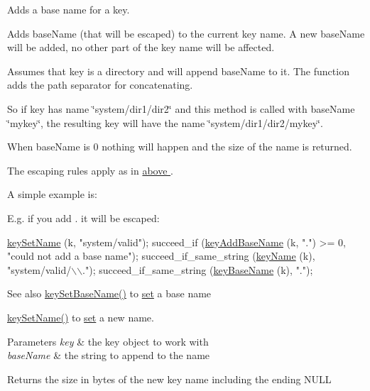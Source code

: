 Adds a base name for a key. 

Adds {\ttfamily base\+Name} (that will be escaped) to the current key name. A new base\+Name will be added, no other part of the key name will be affected.

Assumes that {\ttfamily key} is a directory and will append {\ttfamily base\+Name} to it. The function adds the path separator for concatenating.

So if {\ttfamily key} has name {\ttfamily \char`\"{}system/dir1/dir2\char`\"{}} and this method is called with {\ttfamily base\+Name} {\ttfamily \char`\"{}mykey\char`\"{}}, the resulting key will have the name {\ttfamily \char`\"{}system/dir1/dir2/mykey\char`\"{}}.

When {\ttfamily base\+Name} is 0 nothing will happen and the size of the name is returned.

The escaping rules apply as in \hyperlink{group__keyname}{above }.

A simple example is\+: 
\begin{DoxyCodeInclude}
\end{DoxyCodeInclude}
 E.\+g. if you add . it will be escaped\+: 
\begin{DoxyCodeInclude}
        \hyperlink{group__keyname_ga7699091610e7f3f43d2949514a4b35d9}{keySetName} (k, \textcolor{stringliteral}{"system/valid"});
        succeed\_if (\hyperlink{group__keyname_gaa942091fc4bd5c2699e49ddc50829524}{keyAddBaseName} (k, \textcolor{stringliteral}{"."}) >= 0, \textcolor{stringliteral}{"could not add a base name"});
        succeed\_if\_same\_string (\hyperlink{group__keyname_ga8e805c726a60da921d3736cda7813513}{keyName} (k), \textcolor{stringliteral}{"system/valid/\(\backslash\)\(\backslash\)."});
        succeed\_if\_same\_string (\hyperlink{group__keyname_gaaff35e7ca8af5560c47e662ceb9465f5}{keyBaseName} (k), \textcolor{stringliteral}{"."});
\end{DoxyCodeInclude}
 \begin{DoxySeeAlso}{See also}
\hyperlink{group__keyname_ga6e804bd453f98c28b0ff51430d1df407}{key\+Set\+Base\+Name()} to \hyperlink{classkdb_1_1Key_a615124f0a2b291e03975b49c233654d7}{set} a base name 

\hyperlink{group__keyname_ga7699091610e7f3f43d2949514a4b35d9}{key\+Set\+Name()} to \hyperlink{classkdb_1_1Key_a615124f0a2b291e03975b49c233654d7}{set} a new name.
\end{DoxySeeAlso}

\begin{DoxyParams}{Parameters}
{\em key} & the key object to work with \\
\hline
{\em base\+Name} & the string to append to the name \\
\hline
\end{DoxyParams}
\begin{DoxyReturn}{Returns}
the size in bytes of the new key name including the ending N\+U\+LL 
\end{DoxyReturn}

